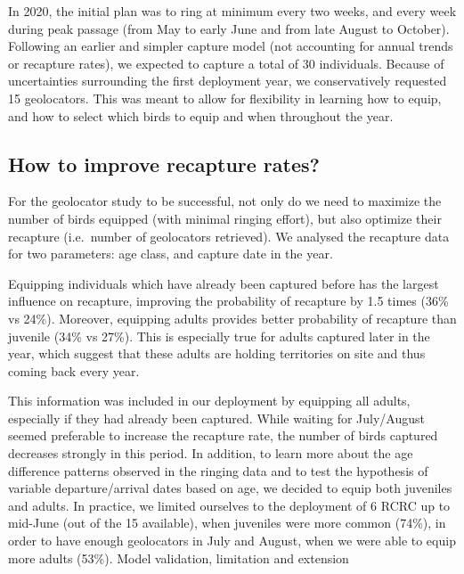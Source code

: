 \documentclass[]{interact}
\theoremstyle{plain}%
\theoremstyle{definition}
\theoremstyle{remark}
\begin{document}
In 2020, the initial plan was to ring at minimum every two weeks, and
every week during peak passage (from May to early June and from late
August to October). Following an earlier and simpler capture model (not
accounting for annual trends or recapture rates), we expected to capture
a total of 30 individuals. Because of uncertainties surrounding the
first deployment year, we conservatively requested 15 geolocators. This
was meant to allow for flexibility in learning how to equip, and how to
select which birds to equip and when throughout the year.

\hypertarget{how-to-improve-recapture-rates}{%
\subsection{How to improve recapture
rates?}\label{how-to-improve-recapture-rates}}

For the geolocator study to be successful, not only do we need to
maximize the number of birds equipped (with minimal ringing effort), but
also optimize their recapture (i.e.~number of geolocators retrieved). We
analysed the recapture data for two parameters: age class, and capture
date in the year.

Equipping individuals which have already been captured before has the
largest influence on recapture, improving the probability of recapture
by 1.5 times (36\% vs 24\%). Moreover, equipping adults provides better
probability of recapture than juvenile (34\% vs 27\%). This is
especially true for adults captured later in the year, which suggest
that these adults are holding territories on site and thus coming back
every year.

This information was included in our deployment by equipping all adults,
especially if they had already been captured. While waiting for
July/August seemed preferable to increase the recapture rate, the number
of birds captured decreases strongly in this period. In addition, to
learn more about the age difference patterns observed in the ringing
data and to test the hypothesis of variable departure/arrival dates
based on age, we decided to equip both juveniles and adults. In
practice, we limited ourselves to the deployment of 6 RCRC up to
mid-June (out of the 15 available), when juveniles were more common
(74\%), in order to have enough geolocators in July and August, when we
were able to equip more adults (53\%). Model validation, limitation and
extension
\end{document}
